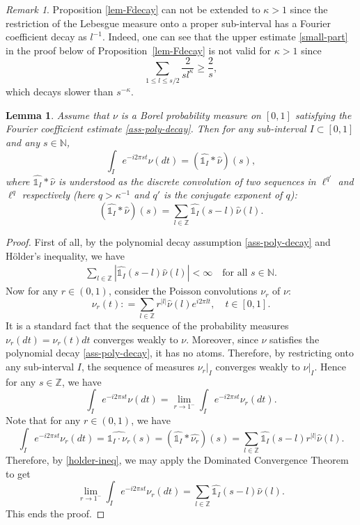 \documentclass[12pt]{amsart}
\newtheorem{lemma}[theorem]{Lemma}
\theoremstyle{definition}
\theoremstyle{remark}
\newtheorem*{remark*}{Remark}
\newcommand{\N}{\mathbb{N}}
\newcommand{\Z}{\mathbb{Z}}
\newcommand{\indi}{\mathds{1}}
\numberwithin{equation}{section}
\begin{document}
\begin{remark*}
Proposition \ref{lem-Fdecay} can not be extended to $\kappa>1$ since the restriction of the Lebesgue measure onto a proper sub-interval has a Fourier coefficient decay as $l^{-1}$. Indeed, one can see that  the upper estimate \eqref{small-part}  in the proof below of Proposition~\ref{lem-Fdecay} is not valid for $\kappa >1$ since 
\[
\sum_{1\le l \le s/2} \frac{2}{s l^\kappa} \ge \frac{2}{s},
\]
which decays slower than $s^{-\kappa}$.
\end{remark*}






\begin{lemma}\label{lem-convol}
Assume that $\nu$ is a Borel probability measure on $[0,1]$ satisfying the Fourier coefficient estimate \eqref{ass-poly-decay}.  Then for any sub-interval $I\subset [0,1]$ and any $s\in \N$, 
\[
\int_I e^{-i 2 \pi s t} \nu(dt)  =  (\widehat{\indi_I}* \widehat{\nu})(s),
\]
where $\widehat{\indi_I}* \widehat{\nu}$ is understood as the discrete convolution of two sequences in $\ell^{q'}$ and $\ell^q$ respectively (here $q>\kappa^{-1}$ and $q'$ is the conjugate exponent of $q$): 
\[
(\widehat{\indi_I}* \widehat{\nu})(s) = \sum_{l\in \Z} \widehat{\indi_I} (s-l) \widehat{\nu}(l).
\]
\end{lemma}

\begin{proof}
First of all, by the polynomial decay assumption \eqref{ass-poly-decay} and H\"older's inequality,  we have 
\begin{align}\label{holder-ineq}
\sum_{l\in \Z} |\widehat{\indi_I} (s-l) \widehat{\nu}(l)|<\infty \quad \text{for all $s\in \N$}. 
\end{align}
Now for any $r\in (0,1)$, consider the Poisson convolutions $\nu_r$  of $\nu$: 
\[
\nu_r (t): =  \sum_{l\in \Z} r^{|l|} \widehat{\nu}(l) e^{i 2\pi l t}, \quad  t \in [0,1].
\]
It is a standard fact that  the sequence of the probability measures $\nu_r(dt)= \nu_r(t)dt$ converges weakly to $\nu$. Moreover, since $\nu$ satisfies the polynomial decay \eqref{ass-poly-decay}, it has no atoms. Therefore, by restricting onto any sub-interval $I$,  the sequence of measures $\nu_r|_I$ converges weakly to $\nu|_I$. Hence for any $s \in \Z$, we have 
\[
\int_I e^{-i 2 \pi  s t} \nu(dt) = \lim_{r\to 1^{-}} \int_I e^{-i 2 \pi s  t} \nu_r(dt).
\]
Note that for any $r\in (0,1)$, we have 
\[
\int_I e^{-i 2 \pi s  t} \nu_r(dt) = \widehat{\indi_I \cdot \nu_r} (s) = ( \widehat{\indi_I} * \widehat{\nu_r})(s) = \sum_{l\in \Z} \widehat{\indi_I} (s-l)   r^{|l|}\widehat{\nu}(l). 
\]
Therefore, by \eqref{holder-ineq}, we may apply the Dominated Convergence Theorem to get 
\[
\lim_{r\to 1^{-}}  \int_I e^{-i 2 \pi s  t} \nu_r(dt)  = \sum_{l\in \Z} \widehat{\indi_I} (s-l)  \widehat{\nu}(l). 
\]
This ends the proof. 
\end{proof}
\end{document}
